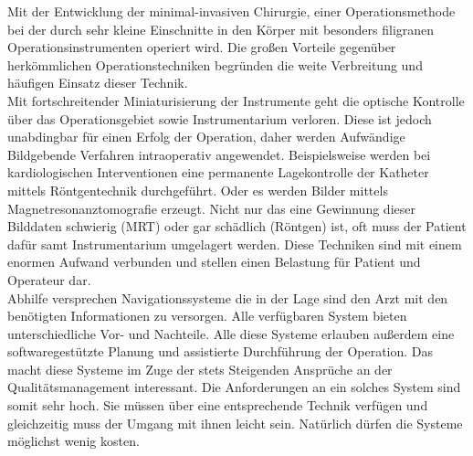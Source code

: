 Mit der Entwicklung der minimal-invasiven Chirurgie, einer Operationsmethode bei der durch sehr kleine Einschnitte in den Körper mit besonders filigranen Operationsinstrumenten operiert wird. Die großen Vorteile gegenüber herkömmlichen Operationstechniken begründen die weite Verbreitung und häufigen Einsatz dieser Technik.\\
Mit fortschreitender Miniaturisierung der Instrumente geht die optische Kontrolle über das Operationsgebiet sowie Instrumentarium verloren. Diese ist jedoch unabdingbar für einen Erfolg der Operation, daher werden Aufwändige Bildgebende Verfahren intraoperativ angewendet. Beispielsweise werden bei kardiologischen Interventionen eine permanente Lagekontrolle der Katheter mittels Röntgentechnik durchgeführt. Oder es werden Bilder mittels Magnetresonanztomografie erzeugt. Nicht nur das eine Gewinnung dieser Bilddaten schwierig (MRT) oder gar schädlich (Röntgen) ist, oft muss der Patient dafür samt Instrumentarium umgelagert werden. Diese Techniken sind mit einem enormen Aufwand verbunden und stellen einen Belastung für Patient und Operateur dar.\\
Abhilfe versprechen Navigationssysteme die in der Lage sind den Arzt mit den benötigten Informationen zu versorgen. Alle verfügbaren System bieten unterschiedliche Vor- und Nachteile. Alle diese Systeme erlauben außerdem eine softwaregestützte Planung und assistierte Durchführung der Operation. Das macht diese Systeme im Zuge der stets Steigenden Ansprüche an der Qualitätsmanagement interessant. Die Anforderungen an ein solches System sind somit sehr hoch. Sie müssen über eine entsprechende Technik verfügen und gleichzeitig muss der Umgang mit ihnen leicht sein. Natürlich dürfen die Systeme möglichst wenig kosten.\\

